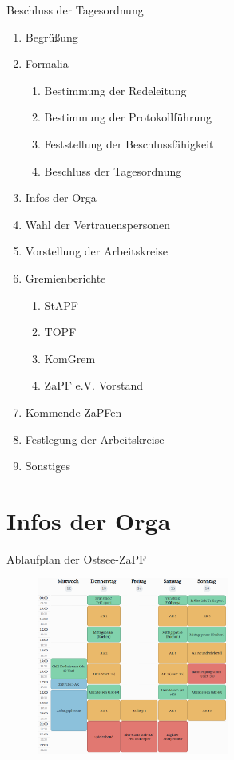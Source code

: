 \documentclass[compress, aspectratio=169]{beamer}
\begin{document}
	\begin{frame}{Beschluss der Tagesordnung}
		\begin{multicols}{2}
			\begin{enumerate}
				\item Begrüßung
				\item Formalia
				\begin{enumerate}
					\item Bestimmung der Redeleitung
					\item Bestimmung der Protokollführung
					\item Feststellung der Beschlussfähigkeit
					\item Beschluss der Tagesordnung
				\end{enumerate}
				\item Infos der Orga
				\item Wahl der Vertrauenspersonen
				\item Vorstellung der Arbeitskreise
				\item Gremienberichte
				\begin{enumerate}
					\item StAPF
					\item TOPF
					\item KomGrem
					\item ZaPF e.V. Vorstand
				\end{enumerate}
				\item Kommende ZaPFen
				\item Festlegung der Arbeitskreise
				\item Sonstiges
			\end{enumerate}
		\end{multicols}
	\end{frame}
	
	\section{Infos der Orga}
	
	\begin{frame}{Ablaufplan der Ostsee-ZaPF}
		\begin{figure}
			\centering
			\includegraphics[height=5.8cm]{Woche1.png}
		\end{figure}
	\end{frame}
	
\end{document}
